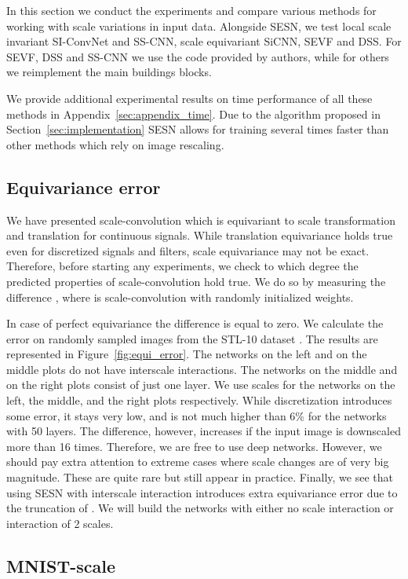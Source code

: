 \documentclass{article} \usepackage{multirow}
\def\Figref#1{Figure~\ref{#1}}
\def\Secref#1{Section~\ref{#1}}
\def\Apref#1{Appendix~\ref{#1}}
\begin{document}
In this section we conduct the experiments and compare various methods for 
working with scale variations in input data.
Alongside SESN, we test local scale invariant SI-ConvNet and SS-CNN, 
scale equivariant SiCNN, SEVF and DSS.
For SEVF, DSS and SS-CNN we use the code provided by authors, 
while for others we reimplement the main buildings blocks.

We provide additional experimental results on time performance of all these methods 
in \Apref{sec:appendix_time}. Due to the algorithm proposed in \Secref{sec:implementation}
SESN allows for training several times faster than other methods which rely on image rescaling.

\subsection{Equivariance error}
We have presented scale-convolution which is equivariant to 
scale transformation and translation for continuous signals. 
While translation equivariance holds 
true even for discretized signals and filters, scale equivariance 
may not be exact. Therefore, before starting any experiments,
we check to which degree the predicted properties of scale-convolution 
hold true. We do so by measuring the difference 
, where 
 is scale-convolution with randomly initialized weights. 

In case of perfect equivariance the difference is equal to zero. 
We calculate the error on randomly sampled images 
from the STL-10 dataset \citet{coates2011analysis}. 
The results are represented in \Figref{fig:equi_error}. 
The networks on the left and on the middle plots do not have interscale interactions. The networks on the middle and on the right plots consist of just one layer. We use  scales for the networks on the left, the middle, and the right plots respectively.
While discretization introduces some error, it stays very low, 
and is not much higher than 6\% for the networks with 50 layers. 
The difference, however, increases if the input image is downscaled more than 16 times.
Therefore, we are free to use deep networks. However, we 
should pay extra attention to extreme cases where scale changes are of 
very big magnitude. These are quite rare but still appear in practice.
Finally, we see that using SESN with interscale interaction introduces 
extra equivariance error due to the truncation of . We will 
build the networks with either no scale interaction or interaction of 2 scales.

\subsection{MNIST-scale}
\label{sec:mnist_scale}
\end{document}
